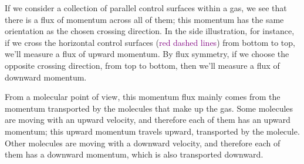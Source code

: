 \documentclass[a4paper,12pt,%
onecolumn,oneside,%
british%
]{memoir}
\renewcommand*{\|}[1][]{\nonscript\:#1\vert\nonscript\:\mathopen{}}
\begin{document}
%
If we consider a collection of parallel control surfaces within a gas, we see that there is a flux of momentum across all of them; this momentum has the same orientation as the chosen crossing direction. In the side illustration, for instance, if we cross the horizontal control surfaces (\textcolor{purple}{red dashed lines}) from bottom to top, we'll measure a flux of upward momentum. By flux symmetry, if we choose the opposite crossing direction, from top to bottom, then we'll measure a flux of downward momentum.

From a molecular point of view, this momentum flux mainly comes from the momentum transported by the molecules that make up the gas. Some molecules are moving with an upward velocity, and therefore each of them has an upward momentum; this upward momentum travels upward, transported by the molecule. Other molecules are moving with a downward velocity, and therefore each of them has a downward momentum, which is also transported downward.

\medskip
\end{document}
